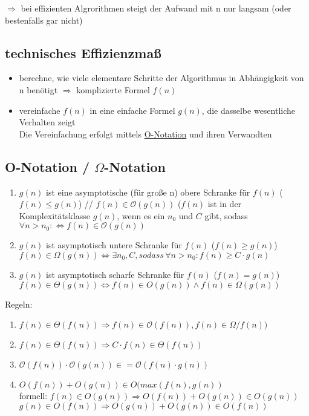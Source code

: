\documentclass{article}
\begin{document}
\begin{itemize}
		$\Rightarrow$ bei effizienten Algrorithmen steigt der Aufwand mit n nur langsam (oder bestenfalls gar nicht)
		
		\subsection{technisches Effizienzmaß}
		\begin{itemize}
			\item berechne, wie viele elementare Schritte der Algorithmus in Abhängigkeit von n benötigt $\Rightarrow$ komplizierte Formel $f(n)$
			\item vereinfache $f(n)$ in eine einfache Formel $g(n)$, die dasselbe wesentliche Verhalten zeigt  \\
			Die Vereinfachung erfolgt mittels \underline{O-Notation} und ihren Verwandten
		\end{itemize}
		
		\subsection{O-Notation / $\Omega$-Notation}
		\begin{enumerate}
			\item $g(n)$ ist eine asymptotische (für große n) obere Schranke für $f(n)$ ($f(n) \leq g(n)$) //
			$f(n) \in \mathcal{O}(g(n))$ ($f(n)$ ist in der Komplexitätsklasse $g(n)$, wenn es ein $n_0$ und $C$ gibt, sodass $\forall n > n_0: \Leftrightarrow f(n) \in \mathcal{O}(g(n))$
			
			\item $g(n)$ ist asymptotisch untere Schranke für $f(n)$ ($f(n) \geq g(n)$) \\
			$f(n) \in \Omega(g(n)) \Leftrightarrow \exists n_0, C , sodass\, \forall n>n_0: f(n) \geq C \cdot g(n)$
			\item $g(n)$ ist  asymptotisch scharfe Schranke für $f(n)$ ($f(n) = g(n)$) \\
			$f(n) \in \Theta(g(n)) \Leftrightarrow f(n) \in O(g(n)) \wedge f(n) \in \Omega(g(n))$
		\end{enumerate}
		Regeln:
		\begin{enumerate}
			\item $f(n) \in \Theta(f(n)) \Rightarrow f(n) \in \mathcal{O}(f(n)), f(n) \in \Omega/f(n))$
			\item $f(n) \in \Theta(f(n)) \Rightarrow C \cdot f(n) \in \Theta(f(n))$
			\item $\mathcal{O}(f(n)) \cdot \mathcal{O}(g(n)) \in = \mathcal{O}(f(n) \cdot g(n))$
			\item $O(f(n)) + O(g(n)) \in O(max(f(n),g(n))$ \\
			formell: $f(n) \in O(g(n)) \Rightarrow O(f(n)) + O(g(n)) \in O(g(n))$
						$g(n) \in O(f(n)) \Rightarrow O(g(n)) + O(g(n)) \in O(f(n))$
			

\end{enumerate}
\end{itemize}
\end{document}
